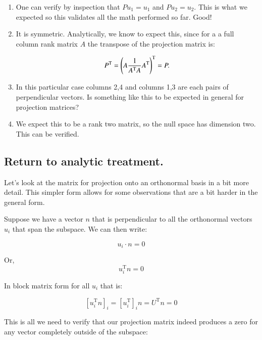 \documentclass{article}      %
\newcommand{\T}[0]{\text{T}}
\begin{document}
\begin{enumerate}
\item
One can verify by inspection that $P u_1 = u_1$ and $P u_2 = u_2$.  This is what we expected
so this validates all the math performed so far.  Good!


\item
It is symmetric.  Analytically, we know to expect this, since for a 
a full column rank matrix $A$ the transpose of the projection matrix is:

\[
P^\T = {\left(A \inv{A^\T A} A^\T \right)}^\T = P.
\]

\item
In this particular case columns 2,4 and columns 1,3 are each pairs of
perpendicular vectors.  Is something like this to be expected in general for
projection matrices?

\item
We expect this to be a rank two matrix, so the null space has dimension two.  This can be verified.

\end{enumerate}

\subsection{ Return to analytic treatment. }

Let's look at the matrix for projection onto an orthonormal basis in a bit more detail.  This simpler form allows for
some observations that are a bit harder in the general form.

Suppose we have a vector $n$ that is perpendicular to all the orthonormal vectors $u_i$ that span the subspace.  We can then write:

\[
u_i \cdot n = 0
\]

Or,
\[
u_i^\T n = 0
\]

In block matrix form for all $u_i$ that is:

\[
[u_i^\T n]_i = [u_i^\T]_i n = U^\T n = 0
\]

This is all we need to verify that our projection matrix indeed produces a zero for any vector completely outside of the subspace:
\end{document}
